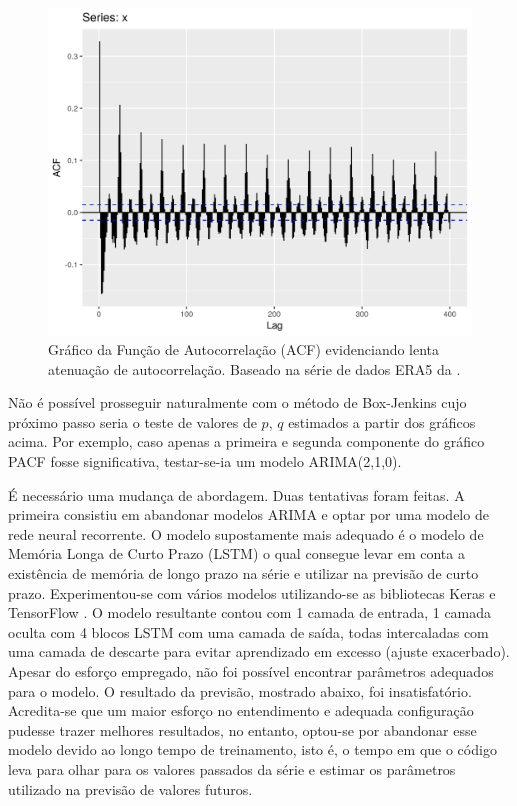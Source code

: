 \documentclass[
	12pt,				%
	openright,			%
	oneside,			%
	a4paper,			%
	english,			%
	french,				%
	spanish,			%
	brazil				%
	]{abntex2}
\begin{document}
\begin{figure}[h]
    \centering
	\includegraphics[width=\textwidth]{long_memory_lagmax.png}
	\caption{Gráfico da Função de Autocorrelação (ACF) evidenciando lenta atenuação de autocorrelação. Baseado na série de dados ERA5 da \cite{era5}.}
\end{figure}
\FloatBarrier 

Não é possível prosseguir naturalmente com o método de Box-Jenkins cujo próximo passo seria o teste de valores de $p$, $q$ estimados a partir dos gráficos acima. Por exemplo, caso apenas a primeira e segunda componente do gráfico PACF fosse significativa, testar-se-ia um modelo ARIMA(2,1,0).

É necessário uma mudança de abordagem. Duas tentativas foram feitas. A primeira consistiu em abandonar modelos ARIMA e optar por uma modelo de rede neural recorrente. O modelo supostamente mais adequado é o modelo de Memória Longa de Curto Prazo (LSTM) o qual consegue levar em conta a existência de memória de longo prazo na série e utilizar na previsão de curto prazo. Experimentou-se com vários modelos utilizando-se as bibliotecas Keras \cite{keras} e TensorFlow \cite{tensorflow}. O modelo resultante contou com 1 camada de entrada, 1 camada oculta com 4 blocos LSTM com uma camada de saída, todas intercaladas com uma camada de descarte para evitar aprendizado em excesso (ajuste exacerbado). Apesar do esforço empregado, não foi possível encontrar parâmetros adequados para o modelo. O resultado da previsão, mostrado abaixo, foi insatisfatório. Acredita-se que um maior esforço no entendimento e adequada configuração pudesse trazer melhores resultados, no entanto, optou-se por abandonar esse modelo devido ao longo tempo de treinamento, isto é, o tempo em que o código leva para olhar para os valores passados da série e estimar os parâmetros utilizado na previsão de valores futuros.
\end{document}
